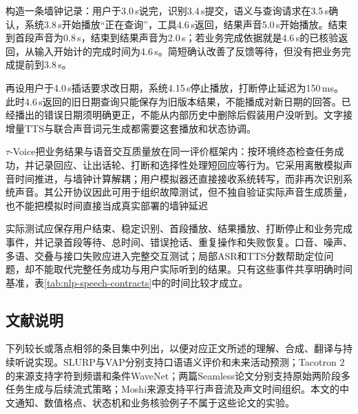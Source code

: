 构造一条墙钟记录：用户于3.0\,s说完，识别3.4\,s提交，语义与查询请求在3.5\,s确认，系统3.8\,s开始播放“正在查询”，工具4.6\,s返回，结果声音5.0\,s开始播放。结束到首段声音为0.8\,s，结束到结果声音为2.0\,s；若业务完成依据就是4.6\,s的已核验返回，从输入开始计的完成时间为4.6\,s。简短确认改善了反馈等待，但没有把业务完成提前到3.8\,s。

再设用户于4.0\,s插话要求改日期，系统4.15\,s停止播放，打断停止延迟为150\,ms。此时4.6\,s返回的旧日期查询只能保存为旧版本结果，不能播成对新日期的回答。已经播出的错误日期须明确更正，不能从内部历史中删除后假装用户没听到。文字接增量TTS与联合声音词元生成都需要这套播放和状态协调。

$\tau$-Voice把业务结果与语音交互质量放在同一评价框架内：按环境终态检查任务成功，并记录回应、让出话轮、打断和选择性处理短回应等行为。它采用离散模拟声音时间推进，与墙钟计算解耦；用户模拟器还直接接收系统转写，而非再次识别系统声音。其公开协议因此可用于组织故障测试，但不独自验证实际声音生成质量，也不能把模拟时间直接当成真实部署的墙钟延迟

实际测试应保存用户结束、稳定识别、首段播放、结果播放、打断停止和业务完成事件，并记录首段等待、总时间、错误抢话、重复操作和失败恢复。口音、噪声、多语、交叠与接口失败应进入完整交互测试；局部ASR和TTS分数帮助定位问题，却不能取代完整任务成功与用户实际听到的结果。只有这些事件共享明确时间基准，表\ref{tab:nlp-speech-contracts}中的时间比较才成立。

\subsection*{文献说明}
\label{sec:nlp-speech-literature}

下列较长或落点相邻的条目集中列出，以便对应正文所述的理解、合成、翻译与持续听说实现。SLURP与VAP分别支持口语语义评价和未来活动预测；Tacotron 2的来源支持字符到频谱和条件WaveNet；两篇Seamless论文分别支持原始两阶段多任务生成与后续流式策略；Moshi来源支持平行声音流及声文时间组织。本文的中文通知、数值格点、状态机和业务核验例子不属于这些论文的实验。

\begin{fullwidth}
  \raggedright
  \par
  \par
  \par
  \par
  \par
\end{fullwidth}

